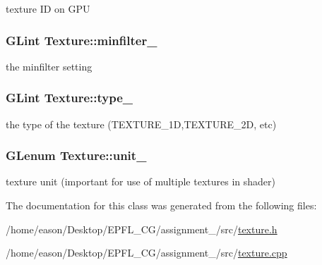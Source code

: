 texture ID on G\+PU 

\subsubsection[{\texorpdfstring{minfilter\+\_\+}{minfilter_}}]{\setlength{\rightskip}{0pt plus 5cm}G\+Lint Texture\+::minfilter\+\_\+\hspace{0.3cm}{\ttfamily [private]}}\hypertarget{classTexture_ab996e764d09b196ed4a468870186f76d}{}\label{classTexture_ab996e764d09b196ed4a468870186f76d}


the minfilter setting 

\subsubsection[{\texorpdfstring{type\+\_\+}{type_}}]{\setlength{\rightskip}{0pt plus 5cm}G\+Lint Texture\+::type\+\_\+\hspace{0.3cm}{\ttfamily [private]}}\hypertarget{classTexture_ab3aecf31a2233f66cb9959f9e01884b2}{}\label{classTexture_ab3aecf31a2233f66cb9959f9e01884b2}


the type of the texture (T\+E\+X\+T\+U\+R\+E\+\_\+1D,T\+E\+X\+T\+U\+R\+E\+\_\+2D, etc) 

\subsubsection[{\texorpdfstring{unit\+\_\+}{unit_}}]{\setlength{\rightskip}{0pt plus 5cm}G\+Lenum Texture\+::unit\+\_\+\hspace{0.3cm}{\ttfamily [private]}}\hypertarget{classTexture_a6ac3d804ac4ef042b5fc0f2580a29ac8}{}\label{classTexture_a6ac3d804ac4ef042b5fc0f2580a29ac8}


texture unit (important for use of multiple textures in shader) 



The documentation for this class was generated from the following files\+:\begin{DoxyCompactItemize}
\item 
/home/eason/\+Desktop/\+E\+P\+F\+L\+\_\+\+C\+G/assignment\+\_/src/\hyperlink{texture_8h}{texture.\+h}\item 
/home/eason/\+Desktop/\+E\+P\+F\+L\+\_\+\+C\+G/assignment\+\_/src/\hyperlink{texture_8cpp}{texture.\+cpp}\end{DoxyCompactItemize}
